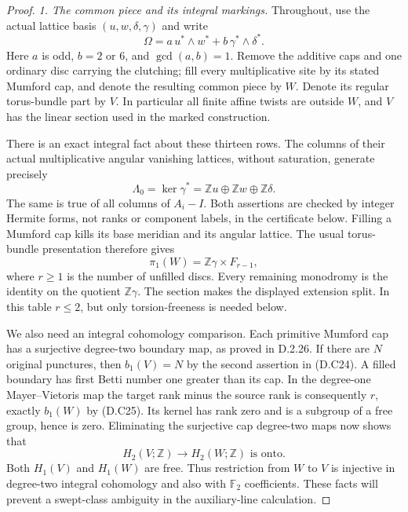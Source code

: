 \begin{proof}
\emph{1. The common piece and its integral markings.}
Throughout, use the actual lattice basis $(u,w,\delta,\gamma)$ and
write
\[
 \Omega=a\,u^*\wedge w^*+b\,\gamma^*\wedge\delta^*.
                                                               \tag{D.C23}
\]
Here $a$ is odd, $b=2$ or $6$, and $\gcd(a,b)=1$.
Remove the additive caps and one ordinary disc carrying the clutching;
fill every multiplicative site by its stated Mumford cap, and denote
the resulting common piece by $W$. Denote its regular torus-bundle
part by $V$. In particular all finite affine twists are outside $W$,
and $V$ has the linear section used in the marked construction.

There is an exact integral fact about these thirteen rows. The columns
of their actual multiplicative angular vanishing lattices, without
saturation, generate precisely
\[
 \Lambda_0=\ker\gamma^*=\mathbb Zu\oplus\mathbb Zw
                    \oplus\mathbb Z\delta.                    \tag{D.C24}
\]
The same is true of all columns of $A_i-I$. Both assertions are checked
by integer Hermite forms, not ranks or component labels, in the
certificate below. Filling a Mumford cap kills its base meridian and
its angular lattice. The usual torus-bundle presentation therefore
gives
\[
 \pi_1(W)=\mathbb Z\gamma\times F_{r-1},
                                                               \tag{D.C25}
\]
where $r\ge1$ is the number of unfilled discs. Every remaining
monodromy is the identity on the quotient $\mathbb Z\gamma$.
The section makes the displayed extension split. In this table
$r\le2$, but only torsion-freeness is needed below.

We also need an integral cohomology comparison. Each primitive
Mumford cap has a surjective degree-two boundary map, as proved in
D.2.26. If there are $N$ original punctures, then $b_1(V)=N$ by the
second assertion in (D.C24). A filled boundary has first Betti number
one greater than its cap. In the degree-one Mayer--Vietoris map the
target rank minus the source rank is consequently $r$, exactly
$b_1(W)$ by (D.C25). Its kernel has rank zero and is a subgroup of a
free group, hence is zero. Eliminating the surjective cap degree-two
maps now shows that
\[
 H_2(V;\mathbb Z)\longrightarrow H_2(W;\mathbb Z)
                  \text{ is onto}.                            \tag{D.C26}
\]
Both $H_1(V)$ and $H_1(W)$ are free. Thus restriction from $W$ to $V$
is injective in degree-two integral cohomology and also with
$\mathbb F_2$ coefficients. These facts will prevent a swept-class
ambiguity in the auxiliary-line calculation.


\end{proof}
